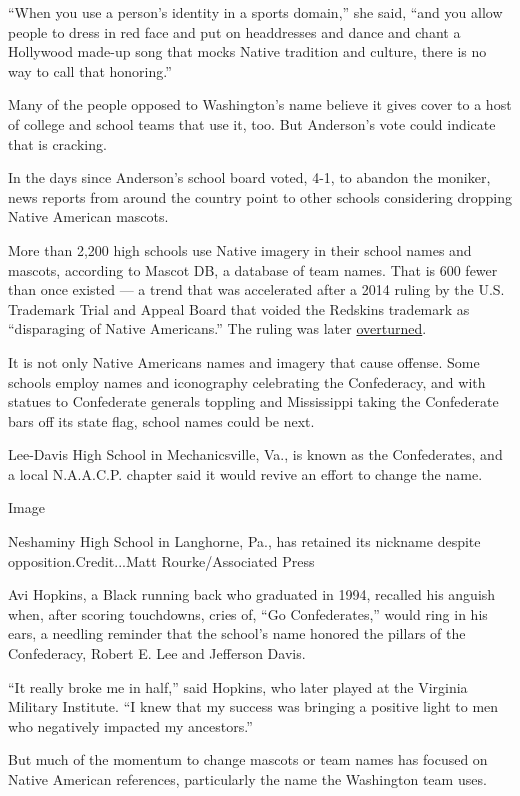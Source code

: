 ``When you use a person's identity in a sports domain,'' she said, ``and
you allow people to dress in red face and put on headdresses and dance
and chant a Hollywood made-up song that mocks Native tradition and
culture, there is no way to call that honoring.''

Many of the people opposed to Washington's name believe it gives cover
to a host of college and school teams that use it, too. But Anderson's
vote could indicate that is cracking.

In the days since Anderson's school board voted, 4-1, to abandon the
moniker, news reports from around the country point to other schools
considering dropping Native American mascots.

More than 2,200 high schools use Native imagery in their school names
and mascots, according to Mascot DB, a database of team names. That is
600 fewer than once existed --- a trend that was accelerated after a
2014 ruling by the U.S. Trademark Trial and Appeal Board that voided the
Redskins trademark as ``disparaging of Native Americans.'' The ruling
was later
\href{https://www.nytimes.com/2017/06/19/us/politics/supreme-court-trademarks-redskins.html}{overturned}.

It is not only Native Americans names and imagery that cause offense.
Some schools employ names and iconography celebrating the Confederacy,
and with statues to Confederate generals toppling and Mississippi taking
the Confederate bars off its state flag, school names could be next.

Lee-Davis High School in Mechanicsville, Va., is known as the
Confederates, and a local N.A.A.C.P. chapter said it would revive an
effort to change the name.

Image

Neshaminy High School in Langhorne, Pa., has retained its nickname
despite opposition.Credit...Matt Rourke/Associated Press

Avi Hopkins, a Black running back who graduated in 1994, recalled his
anguish when, after scoring touchdowns, cries of, ``Go Confederates,''
would ring in his ears, a needling reminder that the school's name
honored the pillars of the Confederacy, Robert E. Lee and Jefferson
Davis.

``It really broke me in half,'' said Hopkins, who later played at the
Virginia Military Institute. ``I knew that my success was bringing a
positive light to men who negatively impacted my ancestors.''

But much of the momentum to change mascots or team names has focused on
Native American references, particularly the name the Washington team
uses.

